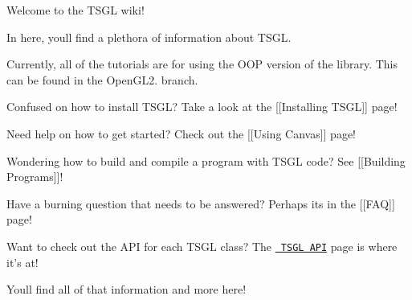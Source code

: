 Welcome to the T\+S\+GL wiki!

In here, you\textquotesingle{}ll find a plethora of information about T\+S\+GL.

Currently, all of the tutorials are for using the O\+OP version of the library. This can be found in the Open\+G\+L2. branch.

Confused on how to install T\+S\+GL? Take a look at the \mbox{[}\mbox{[}Installing T\+S\+GL\mbox{]}\mbox{]} page!

Need help on how to get started? Check out the \mbox{[}\mbox{[}Using Canvas\mbox{]}\mbox{]} page!

Wondering how to build and compile a program with T\+S\+GL code? See \mbox{[}\mbox{[}Building Programs\mbox{]}\mbox{]}!

Have a burning question that needs to be answered? Perhaps it\textquotesingle{}s in the \mbox{[}\mbox{[}F\+AQ\mbox{]}\mbox{]} page!

Want to check out the A\+PI for each T\+S\+GL class? The \href{http://calvin-cs.github.io/TSGL/html/annotated.html}{\texttt{ T\+S\+GL A\+PI}} page is where it’s at!

You\textquotesingle{}ll find all of that information and more here! 